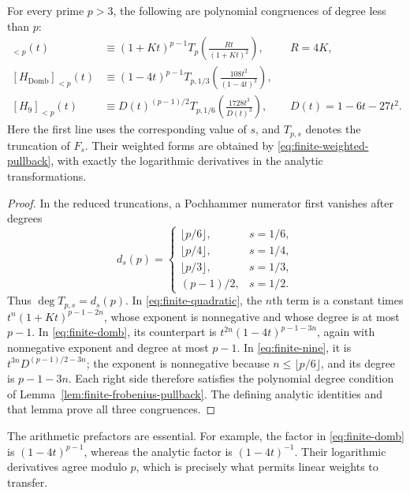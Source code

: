 \begin{proposition}
\label{prop:three-finite-transformations}
For every prime $p>3$, the following are polynomial congruences of
degree less than $p$:
\begin{align}
 [\mathcal G]_{<p}(t)
 &\equiv(1+Kt)^{p-1}
       T_p\!\left(\frac{Rt}{(1+Kt)^2}\right),
       &&R=4K,\label{eq:finite-quadratic}\\
 [H_{\mathrm{Domb}}]_{<p}(t)
 &\equiv(1-4t)^{p-1}
       T_{p,1/3}\!\left(\frac{108t^2}{(1-4t)^3}\right),
       \label{eq:finite-domb}\\
 [H_9]_{<p}(t)
 &\equiv D(t)^{(p-1)/2}
       T_{p,1/6}\!\left(\frac{1728t^3}{D(t)^3}\right),
       &&D(t)=1-6t-27t^2.\label{eq:finite-nine}
\end{align}
Here the first line uses the corresponding value of $s$, and
$T_{p,s}$ denotes the truncation of $F_s$.
Their weighted forms are obtained by
\eqref{eq:finite-weighted-pullback}, with exactly the logarithmic
derivatives in the analytic transformations.
\end{proposition}
\begin{proof}
In the reduced truncations, a Pochhammer numerator first vanishes
after degrees
\[
 d_s(p)=
 \begin{cases}
 \lfloor p/6\rfloor,&s=1/6,\\
 \lfloor p/4\rfloor,&s=1/4,\\
 \lfloor p/3\rfloor,&s=1/3,\\
 (p-1)/2,&s=1/2.
 \end{cases}
\]
Thus $\deg T_{p,s}=d_s(p)$.  In
\eqref{eq:finite-quadratic}, the $n$th term is a constant times
$t^n(1+Kt)^{p-1-2n}$, whose exponent is nonnegative and whose degree
is at most $p-1$.  In \eqref{eq:finite-domb}, its counterpart is
$t^{2n}(1-4t)^{p-1-3n}$, again with nonnegative exponent and degree
at most $p-1$.  In \eqref{eq:finite-nine}, it is
$t^{3n}D^{(p-1)/2-3n}$; the exponent is nonnegative because
$n\le\lfloor p/6\rfloor$, and its degree is $p-1-3n$.
Each right side therefore satisfies the polynomial degree condition
of Lemma~\ref{lem:finite-frobenius-pullback}.  The defining analytic
identities and that lemma prove all three congruences.
\end{proof}

The arithmetic prefactors are essential.  For example, the factor
in \eqref{eq:finite-domb} is $(1-4t)^{p-1}$, whereas the analytic
factor is $(1-4t)^{-1}$.  Their logarithmic derivatives agree modulo
$p$, which is precisely what permits linear weights to transfer.

